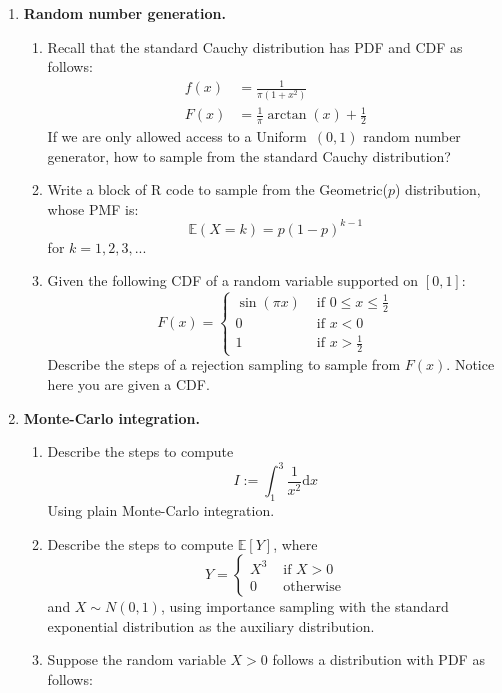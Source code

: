 \documentclass[11pt]{article}
\newcommand{\ep}{\mathbb{E}}
\newcommand{\td}{\textrm{d}}
\begin{document}
\begin{enumerate}
	\item {\bf Random number generation.}
	\begin{enumerate}
		\item\label{Cauchy} Recall that the standard Cauchy distribution has PDF and CDF as follows:
		\begin{align*}
			f(x) &= \frac{1}{\pi(1+x^2)}\\
			F(x) &= \frac{1}{\pi}\arctan(x)+\frac{1}{2}
		\end{align*}
		If we are only allowed access to a Uniform~$(0, 1)$ random number generator, how to sample from the standard Cauchy distribution?
		\item Write a block of R code to sample from the Geometric($p$) distribution, whose PMF is:
		$$
			\ep(X=k) = p(1-p)^{k-1}
		$$
		for $k=1,2,3,...$
		\item Given the following CDF of a random variable supported on $[0, 1]$:
		$$
		F(x)=\begin{cases}
		\sin(\pi x) & \textrm{ if } 0\leq x\leq \frac{1}{2}\\
		0			& \textrm{ if } x<0\\
		1			& \textrm{ if } x>\frac{1}{2}
		\end{cases}
		$$
		Describe the steps of a rejection sampling to sample from $F(x)$. Notice here you are given a CDF.
	\end{enumerate}
	\item {\bf Monte-Carlo integration.}
	\begin{enumerate}
		\item Describe the steps to compute
		$$
			I:=\int_1^3 \frac{1}{x^2}\td x
		$$
		Using plain Monte-Carlo integration.
		\item Describe the steps to compute $\ep[Y]$, where
		$$
			Y=\begin{cases}
				X^3 & \textrm{ if } X>0\\
				0 & \textrm{ otherwise}
			\end{cases}
		$$
		and $X\sim N(0, 1)$, using importance sampling with the standard exponential distribution as the auxiliary distribution.
		\item Suppose the random variable $X>0$ follows a distribution with PDF as follows:

\end{enumerate}
\end{enumerate}
\end{document}
